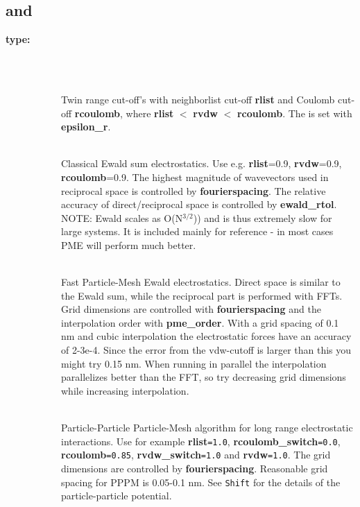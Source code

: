 \subsection{ and }
\begin{description}
\item[{\bf {}type:}]\mbox{}\\
\vspace{-2ex}\begin{description}
\item[]\mbox{}\\
Twin range cut-off's with neighborlist cut-off {\bf rlist} and 
Coulomb cut-off {\bf rcoulomb},
where {\bf rlist} {\tt $<$} {\bf rvdw} {\tt $<$} {\bf rcoulomb}.
The  is set with {\bf epsilon\_r}.
\item[]\mbox{}\\
Classical Ewald sum electrostatics. Use e.g. {\bf rlist}=0.9,
{\bf rvdw}=0.9, {\bf rcoulomb}=0.9. The highest magnitude of
wavevectors used in reciprocal space is controlled by {\bf fourierspacing}.
The relative accuracy of direct/reciprocal space
is controlled by {\bf ewald\_rtol}. NOTE: Ewald scales as O(N$^{3/2}$)) and
is thus extremely slow for large systems. It is included mainly for
reference - in most cases PME will perform much better.
\item[ ]\mbox{}\\
Fast Particle-Mesh Ewald electrostatics. Direct space is similar
to the Ewald sum, while the reciprocal part is performed with
FFTs. Grid dimensions are controlled with {\bf fourierspacing} and the
interpolation order with {\bf pme\_order}. With a grid spacing of 0.1
nm and cubic interpolation the electrostatic forces have an accuracy
of 2-3e-4. Since the error from the vdw-cutoff is larger than this you
might try 0.15 nm. When running in parallel the interpolation
parallelizes better than the FFT, so try decreasing grid dimensions
while increasing interpolation.
\item[]\mbox{}\\
Particle-Particle Particle-Mesh algorithm for long range
electrostatic interactions.
Use for example {\bf rlist}{\tt =1.0}, {\bf rcoulomb\_switch}{\tt =0.0},
{\bf rcoulomb}{\tt =0.85}, {\bf rvdw\_switch}{\tt =1.0}
and {\bf rvdw}{\tt =1.0}. The grid
dimensions are controlled by {\bf fourierspacing}.
Reasonable grid spacing for PPPM is 0.05-0.1 nm.
See {\tt Shift} for the details of the particle-particle potential.

\end{description}
\end{description}
